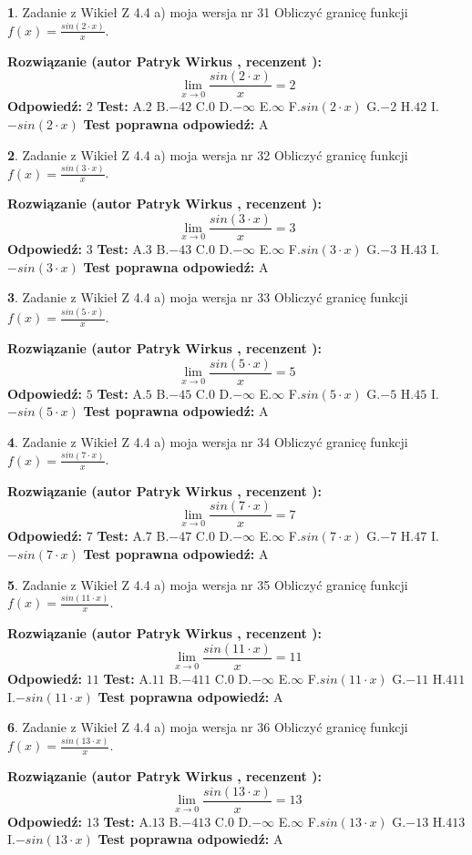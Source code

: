 \documentclass[12pt, a4paper]{article}
\theoremstyle{definition} %
\newtheorem{zad}{}
\newcommand{\zadStart}[1]{\begin{zad}#1\newline}
\newcommand{\zadStop}{\end{zad}}
\newcommand{\rozwStart}[2]{\noindent \textbf{Rozwiązanie (autor #1 , recenzent #2): }\newline}
\newcommand{\rozwStop}{\newline}
\newcommand{\odpStart}{\noindent \textbf{Odpowiedź:}\newline}
\newcommand{\odpStop}{\newline}
\newcommand{\testStart}{\noindent \textbf{Test:}\newline}
\newcommand{\testStop}{\newline}
\newcommand{\kluczStart}{\noindent \textbf{Test poprawna odpowiedź:}\newline}
\newcommand{\kluczStop}{\newline}
\begin{document}
\zadStart{Zadanie z Wikieł Z 4.4 a) moja wersja nr 31}
Obliczyć granicę funkcji $f(x)=\frac{sin(2\cdot x)}{x}$.
\zadStop
\rozwStart{Patryk Wirkus}{}
$$\lim\limits_{x\to 0}\frac{sin(2\cdot x)}{x}=
2$$
\rozwStop
\odpStart
$2$
\odpStop
\testStart
A.$2$
B.$-42$
C.$0$
D.$-\infty$
E.$\infty$
F.$sin(2\cdot x)$
G.$-2$
H.$42$
I.$-sin(2\cdot x)$
\testStop
\kluczStart
A
\kluczStop



\zadStart{Zadanie z Wikieł Z 4.4 a) moja wersja nr 32}
Obliczyć granicę funkcji $f(x)=\frac{sin(3\cdot x)}{x}$.
\zadStop
\rozwStart{Patryk Wirkus}{}
$$\lim\limits_{x\to 0}\frac{sin(3\cdot x)}{x}=
3$$
\rozwStop
\odpStart
$3$
\odpStop
\testStart
A.$3$
B.$-43$
C.$0$
D.$-\infty$
E.$\infty$
F.$sin(3\cdot x)$
G.$-3$
H.$43$
I.$-sin(3\cdot x)$
\testStop
\kluczStart
A
\kluczStop



\zadStart{Zadanie z Wikieł Z 4.4 a) moja wersja nr 33}
Obliczyć granicę funkcji $f(x)=\frac{sin(5\cdot x)}{x}$.
\zadStop
\rozwStart{Patryk Wirkus}{}
$$\lim\limits_{x\to 0}\frac{sin(5\cdot x)}{x}=
5$$
\rozwStop
\odpStart
$5$
\odpStop
\testStart
A.$5$
B.$-45$
C.$0$
D.$-\infty$
E.$\infty$
F.$sin(5\cdot x)$
G.$-5$
H.$45$
I.$-sin(5\cdot x)$
\testStop
\kluczStart
A
\kluczStop



\zadStart{Zadanie z Wikieł Z 4.4 a) moja wersja nr 34}
Obliczyć granicę funkcji $f(x)=\frac{sin(7\cdot x)}{x}$.
\zadStop
\rozwStart{Patryk Wirkus}{}
$$\lim\limits_{x\to 0}\frac{sin(7\cdot x)}{x}=
7$$
\rozwStop
\odpStart
$7$
\odpStop
\testStart
A.$7$
B.$-47$
C.$0$
D.$-\infty$
E.$\infty$
F.$sin(7\cdot x)$
G.$-7$
H.$47$
I.$-sin(7\cdot x)$
\testStop
\kluczStart
A
\kluczStop



\zadStart{Zadanie z Wikieł Z 4.4 a) moja wersja nr 35}
Obliczyć granicę funkcji $f(x)=\frac{sin(11\cdot x)}{x}$.
\zadStop
\rozwStart{Patryk Wirkus}{}
$$\lim\limits_{x\to 0}\frac{sin(11\cdot x)}{x}=
11$$
\rozwStop
\odpStart
$11$
\odpStop
\testStart
A.$11$
B.$-411$
C.$0$
D.$-\infty$
E.$\infty$
F.$sin(11\cdot x)$
G.$-11$
H.$411$
I.$-sin(11\cdot x)$
\testStop
\kluczStart
A
\kluczStop



\zadStart{Zadanie z Wikieł Z 4.4 a) moja wersja nr 36}
Obliczyć granicę funkcji $f(x)=\frac{sin(13\cdot x)}{x}$.
\zadStop
\rozwStart{Patryk Wirkus}{}
$$\lim\limits_{x\to 0}\frac{sin(13\cdot x)}{x}=
13$$
\rozwStop
\odpStart
$13$
\odpStop
\testStart
A.$13$
B.$-413$
C.$0$
D.$-\infty$
E.$\infty$
F.$sin(13\cdot x)$
G.$-13$
H.$413$
I.$-sin(13\cdot x)$
\testStop
\kluczStart
A
\kluczStop
\end{document}
